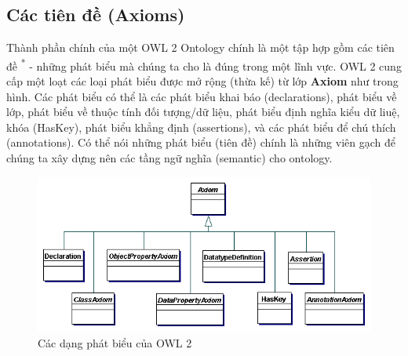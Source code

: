 \subsection{Các tiên đề (Axioms)}
{\let\thefootnote\relax{}
}
Thành phần chính của một OWL 2 Ontology chính là một tập hợp gồm các tiên đề \textsuperscript{*} - những phát biểu mà chúng ta cho là đúng trong một lĩnh vực. OWL 2 cung cấp một loạt các loại phát biểu được mở rộng (thừa kế) từ lớp \textbf{Axiom} như trong hình. Các phát biểu có thể là các phát biểu khai báo (declarations), phát biểu về lớp, phát biểu về thuộc tính đối tượng/dữ liệu, phát biểu định nghĩa kiểu dữ liuệ, khóa (HasKey), phát biểu khẳng định (assertions), và các phát biểu để chú thích (annotations). Có thể nói những phát biểu (tiên đề) chính là những viên gạch để chúng ta xây dựng nên các tầng ngữ nghĩa (semantic) cho ontology.
\begin{figure}[h]
	\centering
	\includegraphics[width=120mm]{Figures/axioms.png}
	\caption{Các dạng phát biểu của OWL 2\label{overflow}}
\end{figure}


